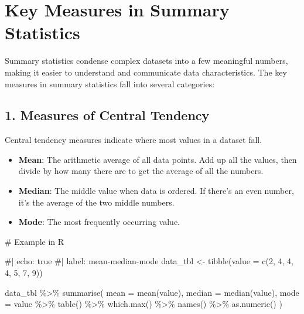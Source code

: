 \documentclass[
  man,
  floatsintext,
  longtable,
  nolmodern,
  notxfonts,
  notimes,
  colorlinks=true,linkcolor=blue,citecolor=blue,urlcolor=blue]{apa7}
\newenvironment{Shaded}{\begin{snugshade}}{\end{snugshade}}
\newcommand{\AttributeTok}[1]{\textcolor[rgb]{0.40,0.45,0.13}{#1}}
\newcommand{\CommentTok}[1]{\textcolor[rgb]{0.37,0.37,0.37}{#1}}
\newcommand{\DecValTok}[1]{\textcolor[rgb]{0.68,0.00,0.00}{#1}}
\newcommand{\FunctionTok}[1]{\textcolor[rgb]{0.28,0.35,0.67}{#1}}
\newcommand{\NormalTok}[1]{\textcolor[rgb]{0.00,0.23,0.31}{#1}}
\newcommand{\OtherTok}[1]{\textcolor[rgb]{0.00,0.23,0.31}{#1}}
\newcommand{\SpecialCharTok}[1]{\textcolor[rgb]{0.37,0.37,0.37}{#1}}
\begin{document}
\section{Key Measures in Summary
Statistics}\label{key-measures-in-summary-statistics}

Summary statistics condense complex datasets into a few meaningful
numbers, making it easier to understand and communicate data
characteristics. The key measures in summary statistics fall into
several categories:

\subsection{1. Measures of Central
Tendency}\label{measures-of-central-tendency}

Central tendency measures indicate where most values in a dataset fall.

\begin{itemize}
\item
  \textbf{Mean}: The arithmetic average of all data points. Add up all
  the values, then divide by how many there are to get the average of
  all the numbers.
\item
  \textbf{Median}: The middle value when data is ordered. If there's an
  even number, it's the average of the two middle numbers.
\item
  \textbf{Mode}: The most frequently occurring value.
\end{itemize}

\begin{Shaded}
\begin{Highlighting}[]
\CommentTok{\# Example in R}

\CommentTok{\#| echo: true}
\CommentTok{\#| label: mean{-}median{-}mode}
\NormalTok{data\_tbl }\OtherTok{\textless{}{-}} \FunctionTok{tibble}\NormalTok{(}\AttributeTok{value =} \FunctionTok{c}\NormalTok{(}\DecValTok{2}\NormalTok{, }\DecValTok{4}\NormalTok{, }\DecValTok{4}\NormalTok{, }\DecValTok{4}\NormalTok{, }\DecValTok{5}\NormalTok{, }\DecValTok{7}\NormalTok{, }\DecValTok{9}\NormalTok{))}

\NormalTok{data\_tbl }\SpecialCharTok{\%\textgreater{}\%}
  \FunctionTok{summarise}\NormalTok{(}
    \AttributeTok{mean =} \FunctionTok{mean}\NormalTok{(value),}
    \AttributeTok{median =} \FunctionTok{median}\NormalTok{(value),}
    \AttributeTok{mode =}\NormalTok{ value }\SpecialCharTok{\%\textgreater{}\%} 
      \FunctionTok{table}\NormalTok{() }\SpecialCharTok{\%\textgreater{}\%} 
      \FunctionTok{which.max}\NormalTok{() }\SpecialCharTok{\%\textgreater{}\%} 
      \FunctionTok{names}\NormalTok{() }\SpecialCharTok{\%\textgreater{}\%} 
      \FunctionTok{as.numeric}\NormalTok{()}
\NormalTok{  )}
\end{Highlighting}
\end{Shaded}
\end{document}
